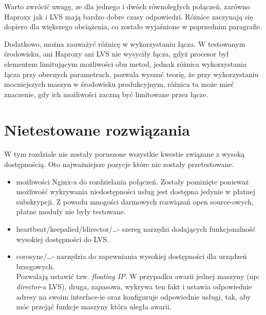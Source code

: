 Warto zwrócić uwagę, ze dla jednego i dwóch równoległych połączeń, zarówno Haproxy jak i LVS mają bardzo dobre czasy odpowiedzi.
Różnice zaczynają się dopiero dla większego obciążenia, co zostało wyjaśnione w poprzednim paragrafie.

Dodatkowo, można zauważyć różnicę w wykorzystaniu łącza.
W testowanym środowisku, ani Haproxy ani LVS nie wysyciły łącza, gdyż procesor był elementem limitującym możliwości obu metod, jednak różnica wykorzystania łącza przy obecnych parametrach, pozwala wysnuć teorię, że przy wykorzystaniu mocniejszych maszyn w środowisku produkcyjnym, różnica ta może mieć znaczenie, gdy ich możliwości zaczną być limitowane przez łącze.
\section{Nietestowane rozwiązania}
W tym rozdziale nie zostały poruszone wszystkie kwestie związane z wysoką dostępnością.
Oto najważniejsze pozycje które nie zostały przetestowane.
\begin{itemize}
	\item możliwości Nginx-a do rozdzielania połączeń.
		Zostały pominięte ponieważ możliwość wykrywania niedostępności usług jest dostępna jedynie w płatnej subskrypcji. Z powodu mnogości darmowych rozwiązań open source-owych, płatne moduły nie były testowane.
	\item heartbeat/keepalied/ldirector/\ldots - szereg narzędzi dodających funkcjonalność wysokiej dostępności do LVS.
	\item corosync/\ldots - narzędzia do zapewniania wysokiej dostępności dla urządzeń brzegowych.\\
		Pozwalają ustawić tzw. \textit{floating IP}.
		W przypadku awarii jednej maszyny (np: \textit{director}-a LVS), druga, zapasowa, wykrywa ten fakt i ustawia odpowiednie adresy na swoim interface-ie oraz konfiguruje odpowiednie usługi, tak, aby móc przejąć funkcje maszyny która uległa awarii.
\end{itemize}
